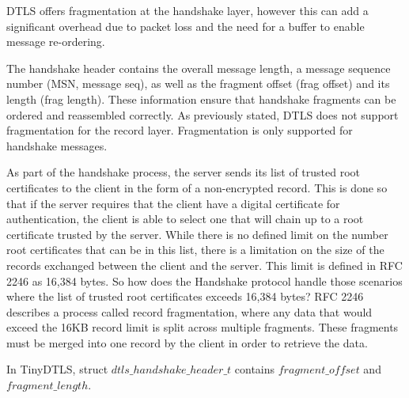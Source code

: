 DTLS offers fragmentation at the handshake layer, however this can add a significant overhead due to packet loss and the need for a buffer to enable message re-ordering.


The handshake header contains the overall message length, a message sequence number (MSN, message seq), as well as the fragment offset (frag offset) and its length (frag length). These information ensure that handshake fragments can be ordered and reassembled correctly. As previously stated, DTLS does not support fragmentation for the record layer. Fragmentation is only supported for handshake messages.


As part of the handshake process, the server sends its list of trusted root certificates to the client in the form of a non-encrypted record. This is done so that if the server requires that the client have a digital certificate for authentication, the client is able to select one that will chain up to a root certificate trusted by the server. While there is no defined limit on the number root certificates that can be in this list, there is a limitation on the size of the records exchanged between the client and the server. This limit is defined in RFC 2246 as 16,384 bytes.
So how does the Handshake protocol handle those scenarios where the list of trusted root certificates exceeds 16,384 bytes? RFC 2246 describes a process called record fragmentation, where any data that would exceed the 16KB record limit is split across multiple fragments. These fragments must be merged into one record by the client in order to retrieve the data. \cite{roepkesurvey}

In TinyDTLS, struct $dtls\_handshake\_header\_t$  contains $fragment\_offset$ and $fragment\_length$.

